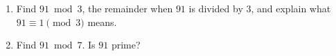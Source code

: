 \begin{enumerate}
\item[(a)] Find $91\bmod3$, the remainder when $91$ is divided by $3$, and explain what $91\equiv1\pmod3$ means.
\item[(b)] Find $91\bmod7$. Is $91$ prime?
\end{enumerate}
